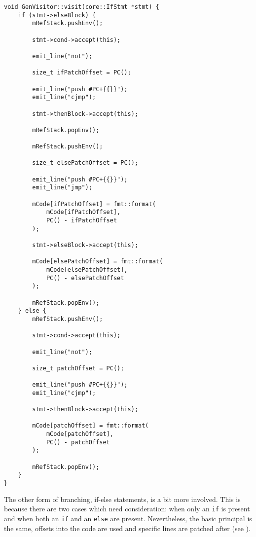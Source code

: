 \begin{lstlisting}[caption={The \texttt{visit(IfStmt *)} method
in the \texttt{GenVisitor} class (ir\_gen/GenVisitor.cpp).},
label=lst:ifstmtgen]
void GenVisitor::visit(core::IfStmt *stmt) {
    if (stmt->elseBlock) {
        mRefStack.pushEnv();

        stmt->cond->accept(this);

        emit_line("not");

        size_t ifPatchOffset = PC();

        emit_line("push #PC+{{}}");
        emit_line("cjmp");

        stmt->thenBlock->accept(this);

        mRefStack.popEnv();

        mRefStack.pushEnv();

        size_t elsePatchOffset = PC();

        emit_line("push #PC+{{}}");
        emit_line("jmp");

        mCode[ifPatchOffset] = fmt::format(
            mCode[ifPatchOffset],
            PC() - ifPatchOffset
        );

        stmt->elseBlock->accept(this);

        mCode[elsePatchOffset] = fmt::format(
            mCode[elsePatchOffset],
            PC() - elsePatchOffset
        );

        mRefStack.popEnv();
    } else {
        mRefStack.pushEnv();

        stmt->cond->accept(this);

        emit_line("not");

        size_t patchOffset = PC();

        emit_line("push #PC+{{}}");
        emit_line("cjmp");

        stmt->thenBlock->accept(this);

        mCode[patchOffset] = fmt::format(
            mCode[patchOffset],
            PC() - patchOffset
        );

        mRefStack.popEnv();
    }
}
\end{lstlisting}

The other form of branching, if-else statements, is a bit more
involved. This is because there are two cases which need
consideration: when only an \texttt{if} is present and when both
an \texttt{if} and an \texttt{else} are present. Nevertheless,
the basic principal is the same, offsets into the code are used
and specific lines are patched after (see ).
